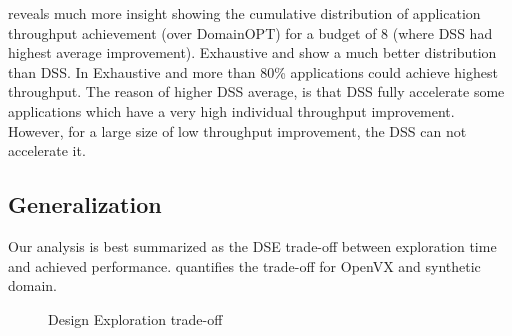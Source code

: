  reveals much more insight showing the cumulative distribution of application throughput achievement (over DomainOPT) for a budget of 8 (where DSS had highest average improvement). 
Exhaustive and \ga show a much better distribution than DSS. In Exhaustive and \ga more than 80\% applications could achieve highest throughput. 
The reason of higher DSS average, is that DSS fully accelerate some applications which have a very high individual throughput improvement.  However, for a large size of low throughput improvement, the DSS can not accelerate it. 



\subsection{Generalization}
\label{sec:generalization}

Our analysis is best summarized as the DSE trade-off between exploration time and achieved performance.  quantifies the trade-off for OpenVX and synthetic domain. 


\begin{figure}[H]
	\centering
		\hfill
	\caption{Design Exploration trade-off}
	\label{fig:paTime}
\end{figure}

